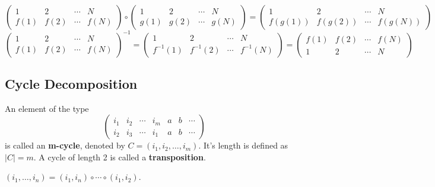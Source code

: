 \documentclass[12pt]{book}
\begin{document}
\begin{lemma}
	\begin{equation}
		\left(\begin{array}{cccc}
		1&2&\cdots&N\\
		f(1)&f(2)&\cdots&f(N)
		\end{array}\right)\circ
		\left(\begin{array}{cccc}
		1&2&\cdots&N\\
		g(1)&g(2)&\cdots&g(N)
		\end{array}\right)=\left(\begin{array}{cccc}
		1&2&\cdots&N\\
		f(g(1))&f(g(2))&\cdots&f(g(N))
		\end{array}\right)
	\end{equation}
	\begin{equation}
		\left(\begin{array}{cccc}
		1&2&\cdots&N\\
		f(1)&f(2)&\cdots&f(N)
		\end{array}\right)^{-1}=
		\left(\begin{array}{cccc}
		1&2&\cdots&N\\
		f^{-1}(1)&f^{-1}(2)&\cdots&f^{-1}(N)
		\end{array}\right)=\left(\begin{array}{cccc}
		f(1)&f(2)&\cdots&f(N)\\
		1&2&\cdots&N
		\end{array}\right)
	\end{equation}
\end{lemma}
\subsection{Cycle Decomposition}
\begin{definition}
	An element of the type
	\begin{equation}
		\left(\begin{array}{ccccccc}
		i_1&i_2&\cdots&i_m&a&b&\cdots\\
		i_2&i_3&\cdots&i_1&a&b&\cdots
		\end{array}\right)
	\end{equation}
	is called an \textbf{m-cycle}, denoted by $C=(i_1,i_2,\dots,i_m)$. It's length is defined as $|C|=m$. A cycle of length 2 is called a \textbf{transposition}.
\end{definition}
	\begin{lemma}
		$(i_1,\dots,i_n)=(i_1,i_n)\circ\cdots\circ(i_1,i_2)$.
	\end{lemma}
	
\end{document}
